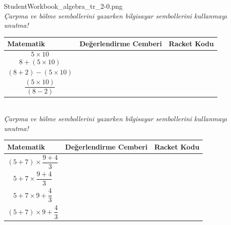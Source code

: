 \documentclass[12pt, a4paper]{article}
\begin{document}
{StudentWorkbook_algebra_tr_2-0.png}
\newpage
{}\\
\textit{Çarpma ve bölme sembollerini yazarken bilgisayar sembollerini kullanmayı unutma!}\\[2ex]
\begin{tabular}{| C{4cm} | C{6cm} | C{6cm} |  }
\hline
\bf Matematik&\bf Değerlendirme Cemberi&\bf Racket Kodu\\
\hline
\begin{displaymath} 5 \times 10 \end{displaymath}  & &  \\[24ex]
\hline
\begin{displaymath} 8 + (5 \times 10 ) \end{displaymath} & &  \\[24ex]
\hline
\begin{displaymath} (8 + 2) - (5 \times 10 ) \end{displaymath}  & &  \\[24ex]
\hline
\begin{displaymath} \frac{(5 \times 10 )}{(8-2)} \end{displaymath}   & &  \\[24ex]
\hline
\end{tabular}
\newpage
{}\\
\textit{Çarpma ve bölme sembollerini yazarken bilgisayar sembollerini kullanmayı unutma!}\\[2ex]
\begin{tabular}{| C{4cm} | C{6cm} | C{6cm} |  }
\hline
\bf Matematik&\bf Değerlendirme Cemberi&\bf Racket Kodu\\
\hline
\begin{displaymath} (5 + 7) \times \frac {9+4}{3} \end{displaymath}  & &  \\[24ex]
\hline
\begin{displaymath} 5+7 \times  \frac {9+4}{3} \end{displaymath} & &  \\[24ex]
\hline
\begin{displaymath} 5+7 \times 9 + \frac {4}{3} \end{displaymath}  & &  \\[24ex]
\hline
\begin{displaymath} (5+7) \times 9 + \frac {4}{3} \end{displaymath}   & &  \\[24ex]
\hline
\end{tabular}
\end{document}
